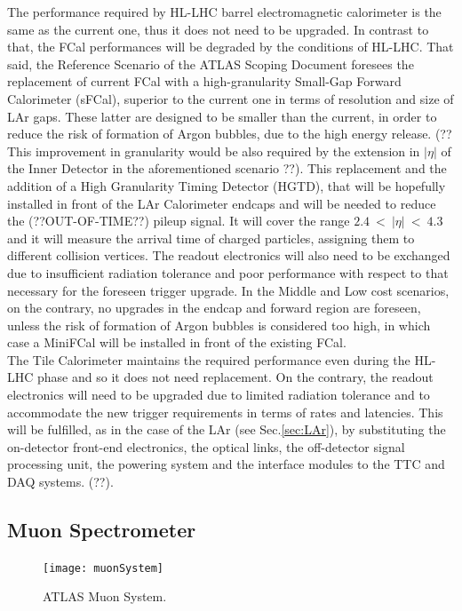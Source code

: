 \documentclass[a4paper,twoside,12pt]{article}
\begin{document}
The performance required by HL-LHC barrel electromagnetic calorimeter is the same as the current one, thus it does not need to be upgraded. In contrast to that, the FCal performances will be degraded by the conditions of HL-LHC. That said, the Reference Scenario of the ATLAS Scoping Document\cite{scoping} foresees the replacement of current FCal with a high-granularity Small-Gap Forward Calorimeter (sFCal), superior to the current one in terms of resolution and size of LAr gaps. These latter are designed to be smaller than the current, in order to reduce the risk of formation of Argon bubbles, due to the high energy release. (?? This improvement in granularity would be also required by the extension in $|\eta|$ of the Inner Detector in the aforementioned scenario ??). This replacement and the addition of a High Granularity Timing Detector (HGTD), that will be hopefully installed in front of the LAr Calorimeter endcaps and will be needed to reduce the (??OUT-OF-TIME??) pileup signal. It will cover the range $2.4\ <\ |\eta|\ <\ 4.3$ and it will measure the arrival time of charged particles, assigning them to different collision vertices. The readout electronics will also need to be exchanged due to insufficient radiation tolerance and poor performance with respect to that necessary for the foreseen trigger upgrade. In the Middle and Low cost 
scenarios, on the contrary, no upgrades in the endcap and forward region are foreseen, unless the risk of formation of Argon bubbles is considered too high, in which case a MiniFCal will be installed in front of the existing FCal. \\

The Tile Calorimeter maintains the required performance even during the HL-LHC phase and
so it does not need replacement. On the contrary, the readout electronics will need to be upgraded due to limited radiation tolerance and to accommodate the new trigger requirements in terms of rates and latencies. This will be fulfilled, as in the case of the LAr (see
Sec.\ref{sec:LAr}), by substituting the on-detector front-end electronics, the optical links, the off-detector signal processing unit, the powering system and the interface modules to the TTC and DAQ systems. (??).

\subsection{Muon Spectrometer}\label{sec:muon}\cite{muon_tdr}\cite{Aad:2008zzm}

\begin{figure} [h]
	\centering
	\texttt{[image: muonSystem]}
	\caption{ATLAS Muon System\cite{muon_tdr}.}
	\label{fig:muonSystem}
\end{figure}
\end{document}

